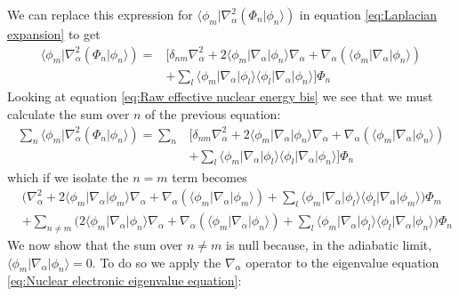 \documentclass[11pt,a4paper]{article}
\begin{document}
We can replace this expression for $\langle\phi_m | \nabla_\alpha^2 (\Phi_n |\phi_n\rangle)$ in equation \eqref{eq:Laplacian expansion} to get
\begin{equation*}
	\begin{split}
		\langle\phi_m | \nabla_\alpha^2 (\Phi_n |\phi_n\rangle) = & \Big[ \delta_{nm} \nabla_\alpha^2 + 2\langle\phi_m | \nabla_\alpha | \phi_n\rangle \nabla_\alpha + \nabla_\alpha(\langle\phi_m | \nabla_\alpha | \phi_n\rangle) \\
		& + \sum_l \langle\phi_m | \nabla_\alpha | \phi_l\rangle \langle\phi_l | \nabla_\alpha | \phi_n\rangle \Big] \Phi_n
	\end{split}
\end{equation*}
Looking at equation \eqref{eq:Raw effective nuclear energy bis} we see that we must calculate the sum over $n$ of the previous equation:
\begin{equation*}
	\begin{split}
		\sum_n \langle\phi_m | \nabla_\alpha^2 (\Phi_n |\phi_n\rangle) = \sum_n & \Big[ \delta_{nm} \nabla_\alpha^2 + 2\langle\phi_m | \nabla_\alpha | \phi_n\rangle \nabla_\alpha + \nabla_\alpha(\langle\phi_m | \nabla_\alpha | \phi_n\rangle) \\
		& + \sum_l \langle\phi_m | \nabla_\alpha | \phi_l\rangle \langle\phi_l | \nabla_\alpha | \phi_n\rangle \Big] \Phi_n
	\end{split}
\end{equation*}
which if we isolate the $n=m$ term becomes
\begin{equation*}
	\begin{split}
		& \Big( \nabla_\alpha^2 + 2\langle\phi_m | \nabla_\alpha | \phi_m\rangle \nabla_\alpha + \nabla_\alpha(\langle\phi_m | \nabla_\alpha | \phi_m\rangle) + \sum_l \langle\phi_m | \nabla_\alpha | \phi_l\rangle \langle\phi_l | \nabla_\alpha | \phi_m\rangle \Big) \Phi_m \\
		& + \sum_{n \neq m} \Big( 2\langle\phi_m | \nabla_\alpha | \phi_n\rangle \nabla_\alpha + \nabla_\alpha(\langle\phi_m | \nabla_\alpha | \phi_n\rangle) + \sum_l \langle\phi_m | \nabla_\alpha | \phi_l\rangle \langle\phi_l | \nabla_\alpha | \phi_n\rangle \Big) \Phi_n
	\end{split}
\end{equation*}
We now show that the sum over $n \neq m$ is null because, in the adiabatic limit, $\langle\phi_m | \nabla_\alpha | \phi_n\rangle = 0$. To do so we apply the $\nabla_{\alpha}$ operator to the eigenvalue equation \eqref{eq:Nuclear electronic eigenvalue equation}:
\end{document}
